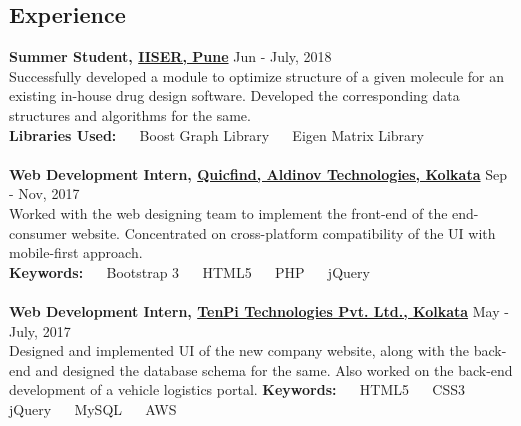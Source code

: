 \documentclass[margin, centered, a4paper]{res}
\begin{document}
\begin{resume}
\section{Experience}
\textbf{Summer Student, \href{http://www.iiserpune.ac.in/}{IISER, Pune}} \hfill{Jun - July, 2018}\\
Successfully developed a module to optimize structure of a given molecule for an existing in-house drug design software. Developed the corresponding data structures and algorithms for the same.\\
\textbf{Libraries Used:} ~\textbullet~ Boost Graph Library ~\textbullet~ Eigen Matrix Library\\
\\
\textbf{Web Development Intern, \href{http://www.quicfind.com}{Quicfind, Aldinov Technologies, Kolkata}} \hfill Sep - Nov, 2017\\
Worked with the web designing team to implement the front-end of the end-consumer website. Concentrated on cross-platform compatibility of the UI with mobile-first approach.\\
\textbf{Keywords:} ~\textbullet~ Bootstrap 3 ~\textbullet~ HTML5 ~\textbullet~ PHP ~\textbullet~ jQuery\\
\\
\textbf{Web Development Intern, \href{http://www.tenpitech.com/}{TenPi Technologies Pvt. Ltd., Kolkata}} \hfill May - July, 2017\\
Designed and implemented UI of the new company website, along with the back-end and designed the database schema for the same. Also worked on the back-end development of a vehicle logistics portal.
\textbf{Keywords:} ~\textbullet~ HTML5 ~\textbullet~ CSS3 ~\textbullet~ jQuery ~\textbullet~ MySQL ~\textbullet~ AWS


\end{resume}
\end{document}
